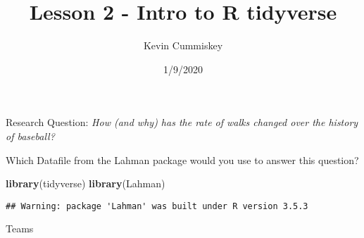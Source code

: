 \documentclass[]{article}
\title{Lesson 2 - Intro to R tidyverse}
\author{Kevin Cummiskey}
\date{1/9/2020}
\newenvironment{Shaded}{\begin{snugshade}}{\end{snugshade}}
\newcommand{\KeywordTok}[1]{\textcolor[rgb]{0.13,0.29,0.53}{\textbf{#1}}}
\newcommand{\NormalTok}[1]{#1}
\begin{document}
\maketitle

Research Question:
\textit{How (and why) has the rate of walks changed over the history of baseball?}

Which Datafile from the Lahman package would you use to answer this
question?

\vspace{1in}

\begin{Shaded}
\begin{Highlighting}[]
\KeywordTok{library}\NormalTok{(tidyverse)}
\KeywordTok{library}\NormalTok{(Lahman)}
\end{Highlighting}
\end{Shaded}

\begin{verbatim}
## Warning: package 'Lahman' was built under R version 3.5.3
\end{verbatim}

\begin{Shaded}
\begin{Highlighting}[]
\NormalTok{Teams}
\end{Highlighting}
\end{Shaded}
\end{document}
